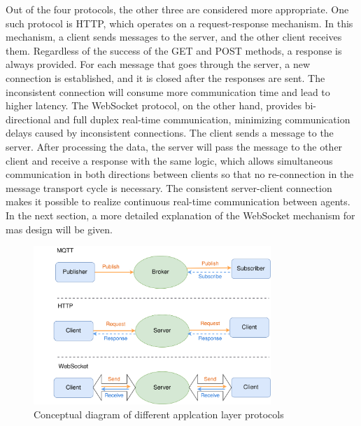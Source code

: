 Out of the four protocols, the other three are considered more appropriate. One such protocol is HTTP, which operates on a request-response mechanism. In this mechanism, a client sends messages to the server, and the other client receives them. Regardless of the success of the GET and POST methods, a response is always provided. For each message that goes through the server, a new connection is established, and it is closed after the responses are sent.
The inconsistent connection will consume more communication time and lead to higher latency. 
The WebSocket protocol, on the other hand, provides bi-directional and full duplex real-time communication, minimizing communication delays caused by inconsistent connections.
The client sends a message to the server. After processing the data, the server will pass the message to the other client and receive a response with the same logic, which allows simultaneous communication in both directions between clients so that no re-connection in the message transport cycle is necessary. The consistent server-client connection makes it possible to realize continuous real-time communication between agents. In the next section, a more detailed explanation of the WebSocket mechanism for \gls{mas} design will be given.
\begin{figure}[htb]
\includegraphics[width=0.8\textwidth]{figures/MessageConceptual.png}
\centering
\caption{Conceptual diagram of different applcation layer 
protocols\label{fig: MsgConceptual}}
\end{figure}

